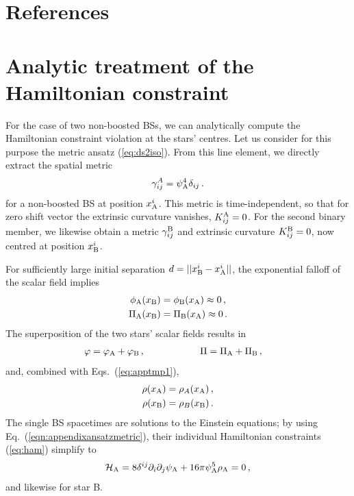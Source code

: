 \documentclass[]{iopart}
\begin{document}
\section*{References}
%



\appendix

\section{Analytic treatment of the Hamiltonian constraint}
\label{sec:hamanalytic}
For the case of two non-boosted BSs, we can analytically compute
the Hamiltonian constraint violation at the stars' centres. Let us
consider for this purpose the metric ansatz (\ref{eq:ds2iso}). From
this line element, we directly extract the spatial metric
%
\begin{equation}
  \gamma_{ij}^{A} = \psi_{\rm A}^4 \delta_{ij}\,.
  \label{eqn:appendixansatzmetric}
\end{equation}
%
for a non-boosted BS at position $x_{\rm A}^i$.  This metric is
time-independent, so that for zero shift vector the extrinsic
curvature vanishes, $K_{ij}^{\rm A} = 0$.  For the second binary
member, we likewise obtain a metric $\gamma^{\rm B}_{ij}$ and
extrinsic curvature $K^{\rm B}_{ij}=0$, now centred at position
$x_{\rm B}^i$.

For sufficiently large initial separation $d=||x_{\rm B}^i -x_{\rm
A}^i||$, the exponential falloff of the scalar field implies
%
\begin{equation}
\begin{aligned}
    \phi_{\rm A}(x_{\rm B}) &= \phi_{\rm B}(x_{\rm A}) \approx 0\,, \\
     \Pi_{\rm A}(x_{\rm B}) &= \Pi_{\rm B}(x_{\rm A}) \approx 0\,.
\end{aligned}
\label{eq:apptmp1}
\end{equation}
%
The superposition of the two stars' scalar fields results in
%
\begin{align}
  &\varphi = \varphi_{\rm A} + \varphi_{\rm B}\,,
  \hspace{0.85cm}~~~~~~~~~~
  \Pi = \Pi_{\rm A} + \Pi_{\rm B}\,,
\end{align}
%
and, combined with Eqs.~(\ref{eq:apptmp1}),
%
\begin{equation}
\begin{aligned}
  \rho(x_{\rm A}) &= \rho_A(x_{\rm A})\,, \\
  \rho(x_{\rm B}) &= \rho_B(x_{\rm B})\,.
\end{aligned}\label{eqn:energydensityconditon}
\end{equation}
%
The single BS spacetimes are solutions to the Einstein equations;
by using Eq.~(\ref{eqn:appendixansatzmetric}), their individual
Hamiltonian constraints (\ref{eq:ham}) simplify to
%
\begin{equation}
    \mathcal{H}_{\rm A} = 8 \delta^{ij} \partial_i\partial_j
    \psi_{\rm A} +  16\pi \psi_{\rm A}^5\rho_{\rm A} = 0\,,
    \label{eq:hamA}
\end{equation}
%
and likewise for star B.
\end{document}
